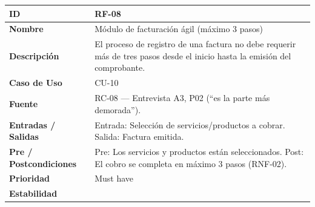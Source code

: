 \documentclass[
]{article}
\newcounter{none} %
\begin{document}
{\def\LTcaptype{none} %
\begin{longtable}[]{|
  >{\raggedright\arraybackslash}p{}|
  >{\raggedright\arraybackslash}p{}|}
\hline
\begin{minipage}[b]{\linewidth}\raggedright
\textbf{ID}
\end{minipage} & \begin{minipage}[b]{\linewidth}\raggedright
RF-08
\end{minipage} \\
\hline
\endhead
\hline
\endlastfoot
\textbf{Nombre} & \begin{minipage}[t]{\linewidth}\raggedright
Módulo de facturación ágil (máximo 3 pasos)
\end{minipage} \\
\hline
\textbf{Descripción} & \begin{minipage}[t]{\linewidth}\raggedright
El proceso de registro de una factura no debe requerir más de tres pasos desde el inicio hasta la emisión del comprobante.
\end{minipage} \\
\hline
\textbf{Caso de Uso} & \begin{minipage}[t]{\linewidth}\raggedright
CU-10
\end{minipage} \\
\hline
\textbf{Fuente} & \begin{minipage}[t]{\linewidth}\raggedright
RC-08 — Entrevista A3, P02 (“es la parte más demorada”).
\end{minipage} \\
\hline
\textbf{Entradas / Salidas} & \begin{minipage}[t]{\linewidth}\raggedright
Entrada: Selección de servicios/productos a cobrar. Salida: Factura emitida.
\end{minipage} \\
\hline
\textbf{Pre / Postcondiciones} & \begin{minipage}[t]{\linewidth}\raggedright
Pre: Los servicios y productos están seleccionados. Post: El cobro se completa en máximo 3 pasos (RNF-02).
\end{minipage} \\
\hline
\textbf{Prioridad} & \begin{minipage}[t]{\linewidth}\raggedright
Must have
\end{minipage} \\
\hline
\textbf{Estabilidad} & \begin{minipage}[t]{\linewidth}\raggedright

\end{minipage}
\end{longtable}}
\end{document}
